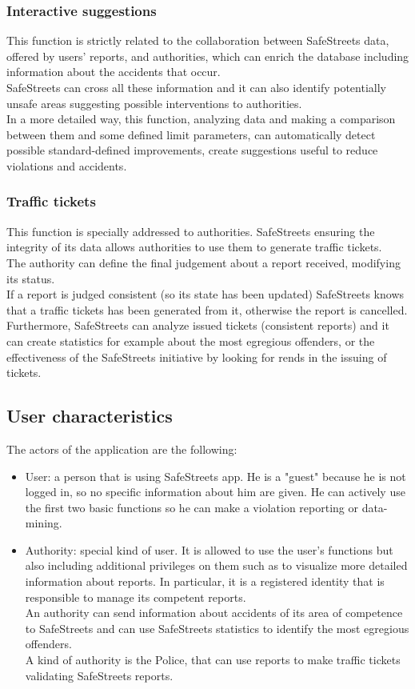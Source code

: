 \documentclass{article}
\begin{document}
		\subsubsection{Interactive suggestions}
			This function is strictly related to the collaboration between SafeStreets data, offered by users' reports, and authorities, which can enrich the database including information about the accidents that occur. \\SafeStreets can cross all these information and it can also identify potentially unsafe areas suggesting possible interventions to authorities. \\
			In a more detailed way, this function, analyzing data and making a comparison between them and some defined limit parameters, can automatically detect possible standard-defined improvements, create suggestions useful to reduce violations and accidents.
		
		\subsubsection{Traffic tickets}
			This function is specially addressed to authorities. SafeStreets ensuring the integrity of its data allows authorities to use them to generate traffic tickets. \\
			The authority can define the final judgement about a report received, modifying its status.\\
			If a report is judged consistent (so its state has been updated) SafeStreets knows that a traffic tickets has been generated from it, otherwise the report is cancelled.\\
			Furthermore, SafeStreets can analyze issued tickets (consistent reports) and it can create statistics for example about the most egregious offenders, or the effectiveness of the SafeStreets initiative by looking for rends in the issuing of tickets.
		
		
		\subsection{User characteristics}
			The actors of the application are the following:
			\begin{itemize}
				\item User: a person that is using SafeStreets app. He is a "guest" because he is not logged in, so no specific information about him are given. He can actively use the first two basic functions so he can make a violation reporting or data-mining.
				\item Authority: special kind of user. It is allowed to use the user's functions but also including additional privileges on them such as to visualize more detailed information about reports. In particular, it is a registered identity that is responsible to manage its competent reports. \\An authority can send information about accidents of its area of competence to SafeStreets and can use SafeStreets statistics to identify the most egregious offenders.\\
		        A kind of authority is the Police, that can use reports to make traffic tickets validating SafeStreets reports.
			\end{itemize}
		
\end{document}
